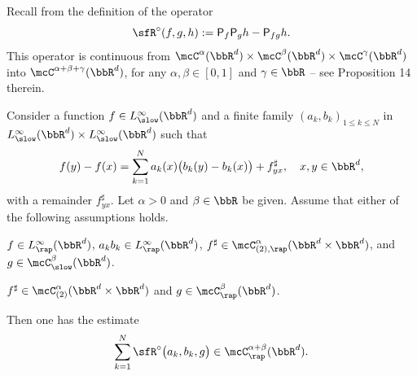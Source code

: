 Recall from \cite{BB16} the definition of the operator
\[
{\sfR}^\circ(f,g,h) := {\sf P}_f{\sf P}_gh - {\sf P}_{fg}h.
\]
This operator is continuous from $\mcC^\alpha(\bbR^d)\times \mcC^\beta(\bbR^d)\times \mcC^\gamma(\bbR^d)$ into $\mcC^{\alpha+\beta+\gamma}(\bbR^d)$, for any $\alpha,\beta\in[0,1]$ and $\gamma\in\bbR$ -- see Proposition 14 therein.

\begin{prop}[{\cite[Prop.\,10]{BH}}]
\label{prop:sum of R}
Consider a function $f\in L_\slow^\infty(\bbR^d)$ and a finite family $(a_k,b_k)_{1\le k\le N}$ in $L_\slow^\infty(\bbR^d)\times L_\slow^\infty(\bbR^d)$ such that
\[
f(y)-f(x) = \sum_{k=1}^N a_k(x)\bigl(b_k(y)-b_k(x)\bigr) + f_{yx}^\sharp,\quad x,y\in\bbR^d,
\]
with a remainder $f_{yx}^\sharp$.
Let $\alpha>0$ and $\beta\in\bbR$ be given. Assume that either of the following assumptions holds.
\begin{enumeratea}
\item\label{prop:sum of Ra} $f\in L_\rap^\infty(\bbR^d)$, $a_kb_k\in L_\rap^\infty(\bbR^d)$, $f^\sharp\in\mcC_{(2),\rap}^\alpha(\bbR^d\times\bbR^d)$, and $g\in \mcC_\slow^\beta(\bbR^d)$.
\item\label{prop:sum of Rb} $f^\sharp\in\mcC_{(2)}^\alpha(\bbR^d\times\bbR^d)$ and $g\in \mcC_\rap^\beta(\bbR^d)$.
\end{enumeratea}
Then one has the estimate
\[
\sum_{k=1}^N {\sfR}^\circ\bigl(a_k,b_k,g\bigr)\in \mcC_\rap^{\alpha+\beta}(\bbR^d).
\]
\end{prop}

